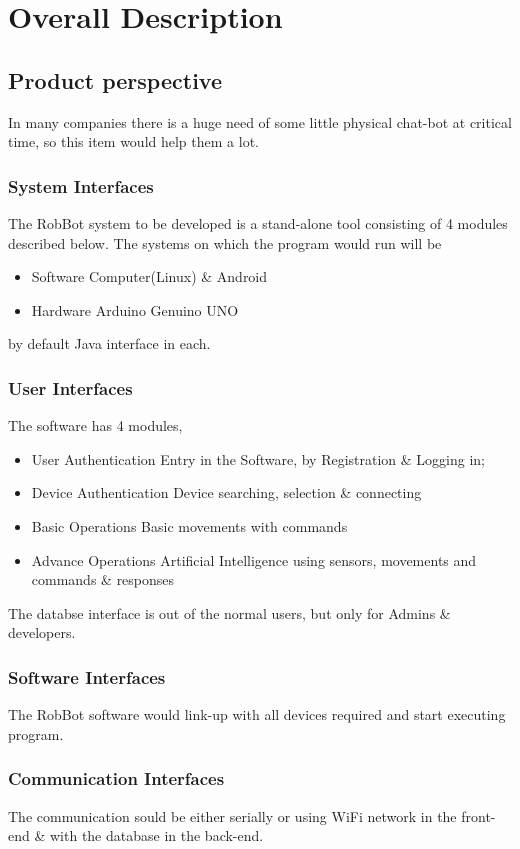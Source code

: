 \chapter{Overall Description}
\section{Product perspective}
In many companies there is a huge need of some little physical chat-bot at critical time, so this item would help them a lot.
\subsection{System Interfaces}
The RobBot system to be developed is a stand-alone tool consisting of 4 modules 
described below. The systems on which the program would run will be
	\begin{itemize}
		\item{Software} Computer(Linux) \& Android
		\item{Hardware} Arduino Genuino UNO
	\end{itemize}
	by default Java interface in each.
\subsection{User Interfaces}
The software has 4 modules,
	\begin{itemize}
		\item{User Authentication} Entry in the Software, by Registration \& Logging in;
		\item{Device Authentication} Device searching, selection \& connecting
		\item{Basic Operations} Basic movements with commands
		\item{Advance Operations} Artificial Intelligence using sensors, movements and commands \& responses
	\end{itemize}
	The databse interface is out of the normal users, but only for Admins \& developers.
\subsection{Software Interfaces}
The RobBot software would link-up with all devices required and start executing program.
\subsection{Communication Interfaces}
The communication sould be either serially or using WiFi network in the front-end \& with the database in the back-end.
